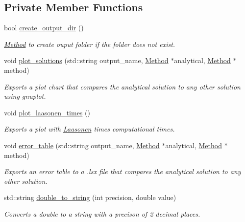 \subsection*{Private Member Functions}
\begin{DoxyCompactItemize}
\item 
bool \hyperlink{classIOManager_a9798220ef88ebb14ffd354a04351862d}{create\+\_\+output\+\_\+dir} ()
\begin{DoxyCompactList}\small\item\em \hyperlink{classMethod}{Method} to create ouput folder if the folder does not exist. \end{DoxyCompactList}\item 
void \hyperlink{classIOManager_a149183e073e33890810fe6801bc4861f}{plot\+\_\+solutions} (std\+::string output\+\_\+name, \hyperlink{classMethod}{Method} $\ast$analytical, \hyperlink{classMethod}{Method} $\ast$method)
\begin{DoxyCompactList}\small\item\em Exports a plot chart that compares the analytical solution to any other solution using gnuplot. \end{DoxyCompactList}\item 
void \hyperlink{classIOManager_addf56e894f0331609d821bd515887f84}{plot\+\_\+laasonen\+\_\+times} ()
\begin{DoxyCompactList}\small\item\em Exports a plot with \hyperlink{classLaasonen}{Laasonen} times computational times. \end{DoxyCompactList}\item 
void \hyperlink{classIOManager_a141e94d64d31d2ce77d8d2adf568d3d3}{error\+\_\+table} (std\+::string output\+\_\+name, \hyperlink{classMethod}{Method} $\ast$analytical, \hyperlink{classMethod}{Method} $\ast$method)
\begin{DoxyCompactList}\small\item\em Exports an error table to a .lsx file that compares the analytical solution to any other solution. \end{DoxyCompactList}\item 
std\+::string \hyperlink{classIOManager_ac0848cdaa155421cd6904650823bdc9e}{double\+\_\+to\+\_\+string} (int precision, double value)
\begin{DoxyCompactList}\small\item\em Converts a double to a string with a precison of 2 decimal places. \end{DoxyCompactList}\end{DoxyCompactItemize}
